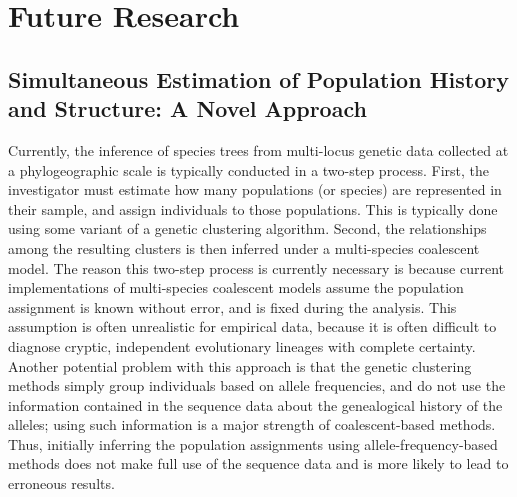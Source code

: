 \documentclass[10pt]{article}
\begin{document}
\section*{Future Research}
\subsection*{Simultaneous Estimation of Population History and Structure: A
Novel Approach}
Currently, the inference of species trees from multi-locus genetic data
collected at a phylogeographic scale is typically conducted in a two-step
process.
First, the investigator must estimate how many populations (or species) are
represented in their sample, and assign individuals to those populations.
This is typically done using some variant of a genetic clustering algorithm.
Second, the relationships among the resulting clusters is then inferred under a
multi-species coalescent model.
The reason this two-step process is currently necessary is because current
implementations of multi-species coalescent models assume the population
assignment is known without error, and is fixed during the analysis.
This assumption is often unrealistic for empirical data, because it is often
difficult to diagnose cryptic, independent evolutionary lineages with complete
certainty.
Another potential problem with this approach is that the genetic clustering
methods simply group individuals based on allele frequencies, and do not use
the information contained in the sequence data about the genealogical history
of the alleles; using such information is a major strength of coalescent-based
methods.
Thus, initially inferring the population assignments using
allele-frequency-based methods does not make full use of the sequence data and
is more likely to lead to erroneous results.
\end{document}
